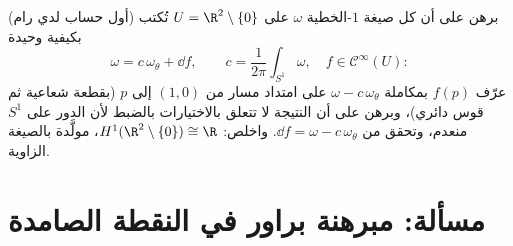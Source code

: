 \begin{exercise}[$\star\star\star$]\label{exo:b3:forms:12}
(أول حساب لدي رام) برهن على أن كل صيغة $1$-الخطية 
$\omega$ على $U = \R^2\setminus\{0\}$ تُكتب بكيفية وحيدة
\[
\omega = c\,\omega_\theta + \dd f,
\qquad c = \frac1{2\pi}\int_{S^1}\omega,\quad f \in
\mathcal C^\infty(U) :
\]
عرّف $f(p)$ بمكاملة $\omega - c\,\omega_\theta$ على امتداد مسار من $(1,0)$ إلى $p$
(بقطعة شعاعية ثم قوس دائري)، وبرهن على أن النتيجة لا تتعلق
بالاختيارات بالضبط لأن الدور على $S^1$ منعدم، وتحقق من $\dd
f = \omega - c\,\omega_\theta$.
واخلص: $H^1(\R^2\setminus\{0\}) \cong \R$، مولَّدة بالصيغة الزاوية.
\end{exercise}

\section{مسألة: مبرهنة براور في النقطة الصامدة}

